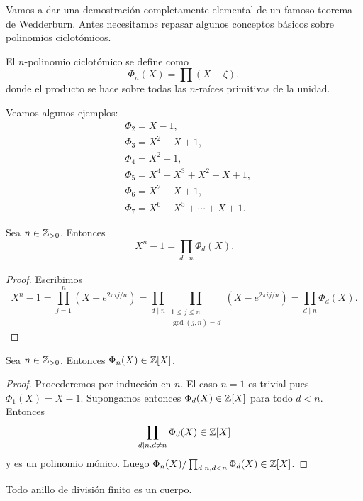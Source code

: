 Vamos a dar una demostración completamente elemental de un famoso teorema de
Wedderburn.  Antes necesitamos repasar algunos conceptos básicos sobre
polinomios ciclotómicos.

\begin{definition}
	El $n$-polinomio ciclotómico se define como
	\begin{equation}
		\label{eq:ciclotomico}
		\Phi_n(X)=\prod(X-\zeta),
	\end{equation}
	donde el producto se hace sobre todas las $n$-raíces primitivas de la
	unidad. 
\end{definition}

\begin{example}
	Veamos algunos ejemplos:
	\begin{align*}
		&\Phi_2=X-1,\\
		&\Phi_3=X^2+X+1,\\
		&\Phi_4=X^2+1,\\
		&\Phi_5=X^4+X^3+X^2+X+1,\\
		&\Phi_6=X^2-X+1,\\
		&\Phi_7=X^6+X^5+\cdots+X+1.
	\end{align*}
\end{example}

\begin{lemma}
	Sea $n\in\mathbb{Z}_{>0}$. Entonces 
	\[
		X^n-1=\prod_{d\mid n}\Phi_d(X).
	\]
\end{lemma}

\begin{proof}
	Escribimos
	\[
		X^n-1=\prod_{j=1}^n (X-e^{2\pi ij/n})
		=\prod_{d\mid n}\prod_{\substack{1\leq j\leq n\\\gcd(j,n)=d}}(X-e^{2\pi ij/n})
		=\prod_{d\mid n}\Phi_d(X).
	\]
\end{proof}

\begin{lemma}
	Sea $n\in\mathbb{Z}_{>0}$. Entonces $\Phi_n(X)\in\mathbb{Z}[X]$.
\end{lemma}

\begin{proof}
	Procederemos por inducción en $n$. El caso $n=1$ es trivial pues
	$\Phi_1(X)=X-1$. Supongamos entonces $\Phi_d(X)\in\mathbb{Z}[X]$ para todo $d<n$.
	Entonces 
	\[
		\prod_{d\mid n,d\ne n}\Phi_d(X)\in\mathbb{Z}[X]
	\]
	y es un polinomio mónico. Luego $\Phi_n(X)/\prod_{d\mid
	n,d<n}\Phi_d(X)\in\mathbb{Z}[X]$.
\end{proof}

\begin{theorem}[Wedderburn]
	Todo anillo de división finito es un cuerpo. 
\end{theorem}

